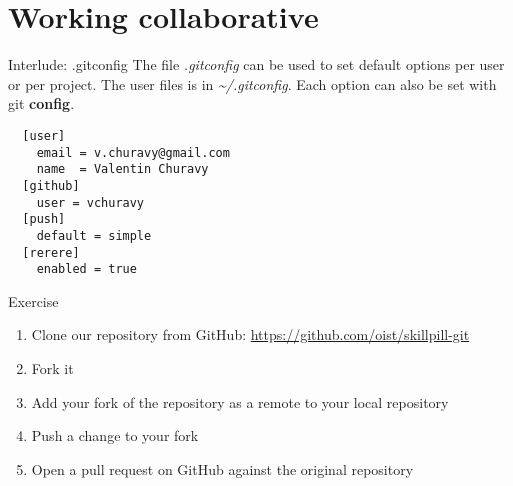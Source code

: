 \documentclass{beamer}
\begin{document}
\section{Working collaborative}
\begin{frame}[fragile]{Interlude: .gitconfig}
  The file \emph{.gitconfig} can be used to set default options per user or per project. The user files is in \emph{\textasciitilde/.gitconfig}. Each option can also be set with git \textbf{config}.
  \begin{lstlisting}
  [user]
    email = v.churavy@gmail.com
    name  = Valentin Churavy
  [github]
    user = vchuravy
  [push]
    default = simple
  [rerere]
    enabled = true
  \end{lstlisting}
\end{frame}


\begin{frame}
  \begin{block}{Exercise}
    \begin{enumerate}
      \item Clone our repository from GitHub: \url{https://github.com/oist/skillpill-git}
      \item Fork it
      \item Add your fork of the repository as a remote to your local repository
      \item Push a change to your fork
      \item Open a pull request on GitHub against the original repository
    \end{enumerate}
  \end{block}
\end{frame}
\end{document}

